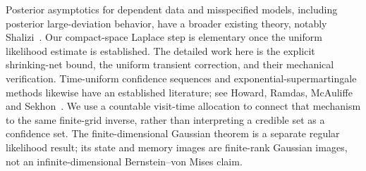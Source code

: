 Posterior asymptotics for dependent data and misspecified models, including
posterior large-deviation behavior, have a broader existing theory, notably
Shalizi~\cite{Shalizi2009}. Our compact-space Laplace step is elementary
once the uniform likelihood estimate is established. The detailed work here
is the explicit shrinking-net bound, the uniform transient correction,
and their mechanical verification. Time-uniform confidence sequences and
exponential-supermartingale methods likewise have an established literature;
see Howard, Ramdas, McAuliffe and Sekhon~\cite{HowardEtAl2021}. We use a
countable visit-time allocation to connect that mechanism to the same
finite-grid inverse, rather than interpreting a credible set as a confidence
set. The finite-dimensional Gaussian theorem is a separate regular
likelihood result; its state and memory images are finite-rank Gaussian
images, not an infinite-dimensional Bernstein--von Mises claim.
